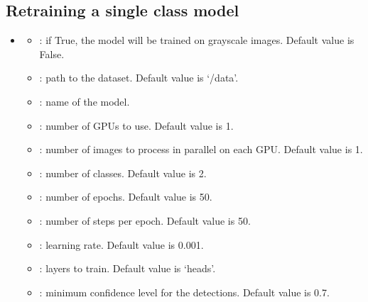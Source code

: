 \documentclass[letterpaper,10pt,english]{sphinxmanual}
\begin{document}
\subsection{Retraining a single class model}
\label{\detokenize{index:retraining-a-single-class-model}}\begin{itemize}
\item {} \begin{description}
\begin{itemize}
\item {} 
\sphinxAtStartPar
{}: if True, the model will be trained on grayscale images. Default value is False.

\item {} 
\sphinxAtStartPar
{}: path to the dataset. Default value is ‘/data’.

\item {} 
\sphinxAtStartPar
{}: name of the model.

\item {} 
\sphinxAtStartPar
{}: number of GPUs to use. Default value is 1.

\item {} 
\sphinxAtStartPar
{}: number of images to process in parallel on each GPU. Default value is 1.

\item {} 
\sphinxAtStartPar
{}: number of classes. Default value is 2.

\item {} 
\sphinxAtStartPar
{}: number of epochs. Default value is 50.

\item {} 
\sphinxAtStartPar
{}: number of steps per epoch. Default value is 50.

\item {} 
\sphinxAtStartPar
{}: learning rate. Default value is 0.001.

\item {} 
\sphinxAtStartPar
{}: layers to train. Default value is ‘heads’.

\item {} 
\sphinxAtStartPar
{}: minimum confidence level for the detections. Default value is 0.7.


\end{itemize}
\end{description}
\end{itemize}
\end{document}
